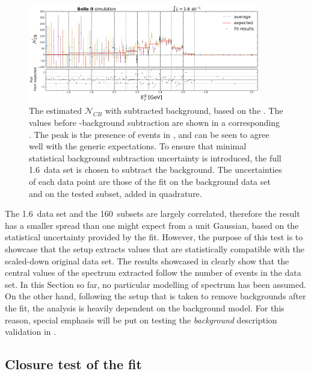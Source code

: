 \begin{figure}[htbp!]
    \includegraphics[width=0.9\textwidth]{figures/mc_validation/subtracted_signal_generic_mc.pdf}
    \caption{\label{fig:subtracted_validation_mc}
    The estimated $\mathcal{N}_{CB}$ with subtracted background, based on the .
    The values before \BB-background subtraction are shown in a corresponding .
    The peak is the presence of \BtoXsgamma events in \MC, and can be seen to agree well with the generic \MC expectations.
    To ensure that minimal statistical background subtraction uncertainty is introduced, the full 1.6~\invab data set is chosen to subtract the background.
    The uncertainties of each data point are those of the \Mbc fit on the background data set and on the tested subset, added in quadrature.
    }
\end{figure}

The 1.6~\invab data set and the 160~\invfb subsets are largely correlated, therefore the result has a smaller spread than one might expect from a unit Gaussian, based on the statistical uncertainty provided by the fit.
However, the purpose of this test is to showcase that the setup extracts values that are statistically compatible with the scaled-down original data set.
The results showcased in  clearly show that the central values of the \EB spectrum extracted follow the number of \BtoXsgamma events in the data set.
In this Section so far, no particular modelling of \BtoXsgamma spectrum has been assumed.
On the other hand, following the setup that is taken to remove \BB backgrounds after the \Mbc fit, the analysis is heavily dependent on the background model.
For this reason, special emphasis will be put on testing the \textit{background} description validation in .

\subsection{Closure test of the \texorpdfstring{\Mbc}{Mbc} fit}\label{sec:closure_test}

